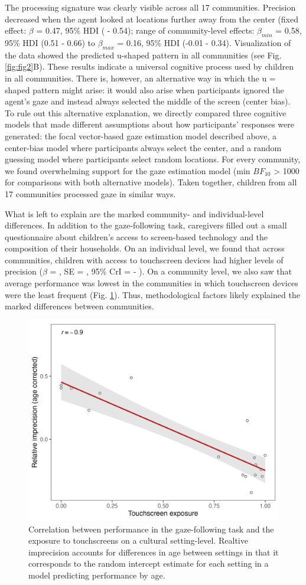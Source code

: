 \documentclass[
  man,floatsintext]{apa6}
\begin{document}
The processing signature was clearly visible across all 17 communities. Precision decreased when the agent looked at locations further away from the center (fixed effect: \(\beta\) = 0.47, 95\% HDI ( - 0.54); range of community-level effects: \(\beta_{min}\) = 0.58, 95\% HDI (0.51 - 0.66) to \(\beta_{max}\) = 0.16, 95\% HDI (-0.01 - 0.34). Visualization of the data showed the predicted u-shaped pattern in all communities (see Fig. \ref{fig:fig2}B). These results indicate a universal cognitive process used by children in all communities. There is, however, an alternative way in which the u = shaped pattern might arise: it would also arise when participants ignored the agent's gaze and instead always selected the middle of the screen (center bias). To rule out this alternative explanation, we directly compared three cognitive models that made different assumptions about how participants' responses were generated: the focal vector-based gaze estimation model described above, a center-bias model where participants always select the center, and a random guessing model where participants select random locations. For every community, we found overwhelming support for the gaze estimation model (min \(BF_{10}\) \textgreater{} 1000 for comparisons with both alternative models). Taken together, children from all 17 communities processed gaze in similar ways.

What is left to explain are the marked community- and individual-level differences. In addition to the gaze-following task, caregivers filled out a small questionnaire about children's access to screen-based technology and the composition of their households. On an individual level, we found that across communities, children with access to touchscreen devices had higher levels of precision (\(\beta\) = , SE = , 95\% CrI = - ). On a community level, we also saw that average performance was lowest in the communities in which touchscreen devices were the least frequent (Fig. \ref{fig:fig3}). Thus, methodological factors likely explained the marked differences between communities.

\begin{figure}

{\centering \includegraphics[width=0.5\linewidth]{../visuals/pcomtc} 

}

\caption{Correlation between performance in the gaze-following task and the exposure to touchscreens on a cultural setting-level. Realtive imprecision accounts for differences in age between settings in that it corresponds to the random intercept estimate for each setting in a model predicting performance by age.}\label{fig:fig3}
\end{figure}
\end{document}
